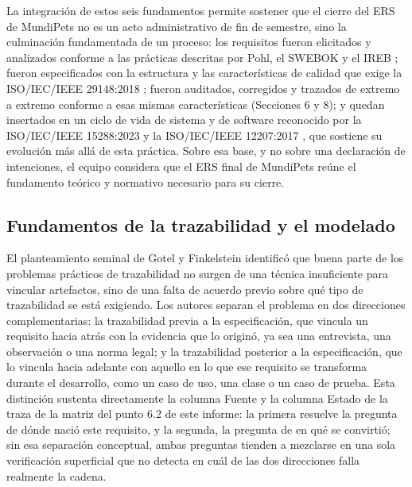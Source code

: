 \documentclass[journal,onecolumn]{IEEEtran}
\begin{document}
	La integración de estos seis fundamentos permite sostener que el cierre del ERS de MundiPets no es un
	acto administrativo de fin de semestre, sino la culminación fundamentada de un proceso: los requisitos
	fueron elicitados y analizados conforme a las prácticas descritas por Pohl, el SWEBOK y el IREB
	\cite{pohl2025,swebok2024,ireb2026}; fueron especificados con la estructura y las características de
	calidad que exige la ISO/IEC/IEEE 29148:2018 \cite{ieee29148}; fueron auditados, corregidos y trazados
	de extremo a extremo conforme a esas mismas características (Secciones 6 y 8); y quedan insertados en
	un ciclo de vida de sistema y de software reconocido por la ISO/IEC/IEEE 15288:2023 y la
	ISO/IEC/IEEE 12207:2017 \cite{iso15288,iso12207}, que sostiene su evolución más allá de esta práctica.
	Sobre esa base, y no sobre una declaración de intenciones, el equipo considera que el ERS final de
	MundiPets reúne el fundamento teórico y normativo necesario para su cierre.
	
	\subsection*{Fundamentos de la trazabilidad y el modelado}
	
	El planteamiento seminal de Gotel y Finkelstein \cite{gotel1994}
	identificó que buena parte de los problemas prácticos de trazabilidad no
	surgen de una técnica insuficiente para vincular artefactos, sino de una
	falta de acuerdo previo sobre qué tipo de trazabilidad se está
	exigiendo. Los autores separan el problema en dos direcciones
	complementarias: la trazabilidad previa a la especificación, que vincula
	un requisito hacia atrás con la evidencia que lo originó, ya sea una
	entrevista, una observación o una norma legal; y la trazabilidad
	posterior a la especificación, que lo vincula hacia adelante con aquello
	en lo que ese requisito se transforma durante el desarrollo, como un
	caso de uso, una clase o un caso de prueba. Esta distinción sustenta
	directamente la columna Fuente y la columna Estado de la traza de la
	matriz del punto 6.2 de este informe: la primera resuelve la pregunta de
	dónde nació este requisito, y la segunda, la pregunta de en qué se
	convirtió; sin esa separación conceptual, ambas preguntas tienden a
	mezclarse en una sola verificación superficial que no detecta en cuál de
	las dos direcciones falla realmente la cadena.
	
\end{document}
